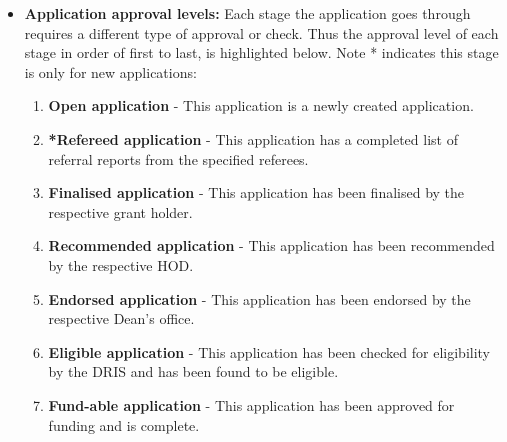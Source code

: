 \documentclass[12pt]{article}
\begin{document}
	
	\begin{itemize}
		\item\textbf{Application approval levels:} Each stage the application goes through requires a different type of approval or check. Thus the approval level of each stage in order of first to last, is highlighted below. Note * indicates this stage is only for new applications: 
		\begin{enumerate}
			\item \textbf{Open application} - This application is a newly created application.
			\item \textbf{*Refereed application} - This application has a completed list of referral reports from the specified referees.
			\item \textbf{Finalised application} - This application has been finalised by the respective grant holder.
			\item \textbf{Recommended application} - This application has been recommended by the respective HOD.
			\item \textbf{Endorsed application} - This application has been endorsed by the respective Dean's office.
			\item \textbf{Eligible application} - This application has been checked for eligibility by the DRIS and has been found to be eligible.
			\item \textbf{Fund-able application} - This application has been approved for funding and is complete.
		\end{enumerate}
		

\end{itemize}
\end{document}
